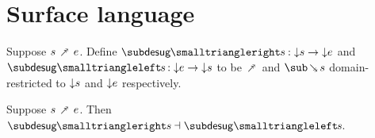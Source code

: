 \section{Surface language}












\begin{definition}
     Suppose $s \desugarFwdR e$. Define $\desugarFwdF{s}: \Below{s} \to \Below{e}$ and $\desugarBwdF{s}: \Below{e} \to \Below{s}$ to be $\desugarFwdR$ and $\desugarBwdR{s}$ domain-restricted to ${\downarrow}{s}$ and ${\downarrow}{e}$ respectively.
\end{definition}

\begin{theorem}
  \label{thm:surface-language:desugar:gc}
     Suppose $s \desugarFwdR e$. Then $\desugarFwdF{s} \adjoint \desugarBwdF{s}$.
\end{theorem}
